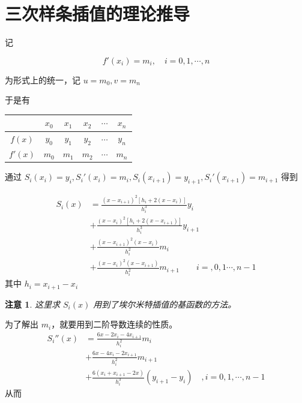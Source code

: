 \documentclass{ctexart}
\newtheorem{attention}{注意}
\numberwithin{equation}{section}
\begin{document}
\section{三次样条插值的理论推导}

记

\begin{equation}
    f'(x_i) = m_i,\quad i=0,1,\cdots,n
\end{equation}

为形式上的统一，记 $u = m_0,v = m_n$

于是有

\begin{table}[htp]
    \begin{center}
        \begin{tabular}{cccccc}
        \toprule
        & $x_0$ & $x_1$ & $x_2$ & $\cdots$ & $x_n$ \\ 
        \midrule
        $f(x)$  & $y_0$ & $y_1$ & $y_2$ & $\cdots$ & $y_n$ \\ 
        $f'(x)$ & $m_0$ & $m_1$ & $m_2$ & $\cdots$ & $m_n$ \\ 
        \bottomrule
        \end{tabular}
    \end{center}
\end{table}

通过 $S_i(x_i)=y_i,S_i'(x_i)=m_i,S_i(x_{i+1})=y_{i+1},S_i'(x_{i+1})=m_{i+1}$ 得到 

\begin{equation}
\begin{aligned}
    S_i(x) 
    & = \frac{\left(x-x_{i+1}\right)^{2}\left[h_{i}+2\left(x-x_{i}\right)\right]}{h_{i}^{3}} y_{i}\\
    & +\frac{\left(x-x_{i}\right)^{2}\left[h_{i}+2\left(x-x_{i+1}\right)\right]}{h_{i}^{3}} y_{i+1} \\
    & + \frac{\left(x-x_{i+1}\right)^{2}\left(x-x_{i}\right)}{h_{i}^{2}} m_{i}\\
    & +\frac{\left(x-x_{i}\right)^{2}\left(x-x_{i+1}\right)}{h_{i}^{2}} m_{i+1}\qquad i = ,0,1\cdots,n-1
    \end{aligned}
\label{eq:8}\end{equation}
其中 $h_i = x_{i+1}-x_i$

\begin{attention}
    这里求 $S_i(x)$ 用到了埃尔米特插值的基函数的方法。
\end{attention}

为了解出 $m_i$，就要用到二阶导数连续的性质。
\begin{equation}
\begin{aligned}
    S_i''(x) &=\frac{6 x-2 x_{i}-4 x_{i+1}}{h_{i}^{2}} m_{i} \\
    &+\frac{6 x-4 x_{i}-2 x_{i+1}}{h_{i}^{2}} m_{i+1} \\
    &+\frac{6\left(x_{i}+x_{i+1}-2 x\right)}{h_{i}^{3}}\left(y_{i+1}-y_{i}\right)\quad,i = 0,1,\cdots,n-1
    \end{aligned}
\end{equation}
从而
\end{document}
